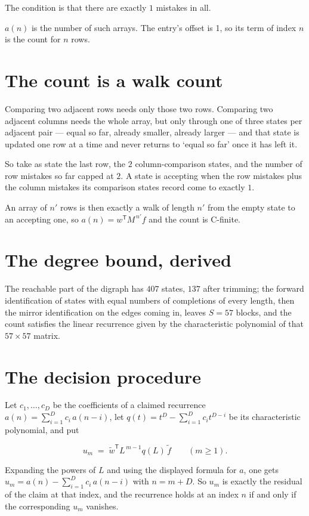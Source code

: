 \documentclass[11pt]{article}
\theoremstyle{definition}
\begin{document}
The condition is that there are exactly $1$ mistakes in all.

$a(n)$ is the number of such arrays. The entry's offset is 1, so its term of index $n$ is the count for $n$ rows.

\section{The count is a walk count}

Comparing two adjacent rows needs only those two rows. Comparing two adjacent columns needs the whole array, but only through one of three states per adjacent pair --- equal so far, already smaller, already larger --- and that state is updated one row at a time and never returns to `equal so far' once it has left it.

So take as state the last row, the $2$ column-comparison states, and the number of row mistakes so far capped at $2$. A state is accepting when the row mistakes plus the column mistakes its comparison states record come to exactly $1$.

An array of $n'$ rows is then exactly a walk of length $n'$ from the empty state to an accepting one, so $a(n) = w^{\mathsf T}M^{\,n'}f$ and the count is C-finite.

\section{The degree bound, derived}

The reachable part of the digraph has $407$ states, $137$ after trimming; the forward identification of states with equal numbers of completions of every length, then the mirror identification on the edges coming in, leaves $S = 57$ blocks, and the count satisfies the linear recurrence given by the characteristic polynomial of that $57\times57$ matrix.

\section{The decision procedure}

Let $c_1,\dots,c_D$ be the coefficients of a claimed recurrence $a(n) = \sum_{i=1}^{D} c_i\,a(n-i)$, let $q(t) = t^{D} - \sum_{i=1}^{D} c_i t^{D-i}$ be its characteristic polynomial, and put

\[u_m \;=\; \tilde w^{\mathsf T} L^{\,m-1} q(L)\,\tilde f \qquad (m \ge 1).\]

Expanding the powers of $L$ and using the displayed formula for $a$, one gets $u_m = a(n) - \sum_{i=1}^{D} c_i\,a(n-i)$ with $n = m + D$. So $u_m$ is exactly the residual of the claim at that index, and the recurrence holds at an index $n$ if and only if the corresponding $u_m$ vanishes.
\end{document}

